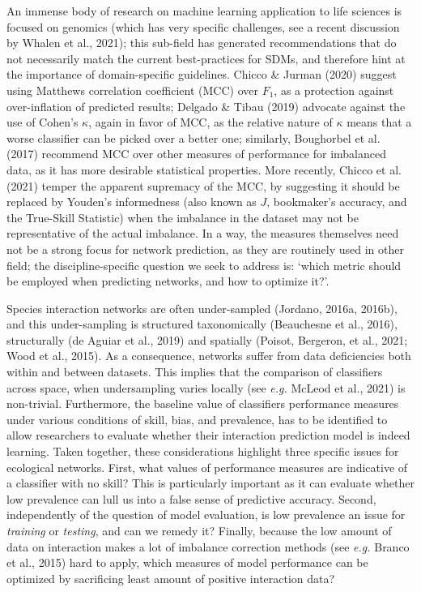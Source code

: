 \documentclass[11pt]{article}
\begin{document}
An immense body of research on machine learning application to life
sciences is focused on genomics (which has very specific challenges, see
a recent discussion by Whalen et al., 2021); this sub-field has
generated recommendations that do not necessarily match the current
best-practices for SDMs, and therefore hint at the importance of
domain-specific guidelines. Chicco \& Jurman (2020) suggest using
Matthews correlation coefficient (MCC) over \(F_1\), as a protection
against over-inflation of predicted results; Delgado \& Tibau (2019)
advocate against the use of Cohen's \(\kappa\), again in favor of MCC,
as the relative nature of \(\kappa\) means that a worse classifier can
be picked over a better one; similarly, Boughorbel et al. (2017)
recommend MCC over other measures of performance for imbalanced data, as
it has more desirable statistical properties. More recently, Chicco et
al. (2021) temper the apparent supremacy of the MCC, by suggesting it
should be replaced by Youden's informedness (also known as \(J\),
bookmaker's accuracy, and the True-Skill Statistic) when the imbalance
in the dataset may not be representative of the actual imbalance. In a
way, the measures themselves need not be a strong focus for network
prediction, as they are routinely used in other field; the
discipline-specific question we seek to address is: `which metric should
be employed when predicting networks, and how to optimize it?'.

Species interaction networks are often under-sampled (Jordano, 2016a,
2016b), and this under-sampling is structured taxonomically (Beauchesne
et al., 2016), structurally (de Aguiar et al., 2019) and spatially
(Poisot, Bergeron, et al., 2021; Wood et al., 2015). As a consequence,
networks suffer from data deficiencies both within and between datasets.
This implies that the comparison of classifiers across space, when
undersampling varies locally (see \emph{e.g.} McLeod et al., 2021) is
non-trivial. Furthermore, the baseline value of classifiers performance
measures under various conditions of skill, bias, and prevalence, has to
be identified to allow researchers to evaluate whether their interaction
prediction model is indeed learning. Taken together, these
considerations highlight three specific issues for ecological networks.
First, what values of performance measures are indicative of a
classifier with no skill? This is particularly important as it can
evaluate whether low prevalence can lull us into a false sense of
predictive accuracy. Second, independently of the question of model
evaluation, is low prevalence an issue for \emph{training} or
\emph{testing}, and can we remedy it? Finally, because the low amount of
data on interaction makes a lot of imbalance correction methods (see
\emph{e.g.} Branco et al., 2015) hard to apply, which measures of model
performance can be optimized by sacrificing least amount of positive
interaction data?
\end{document}
